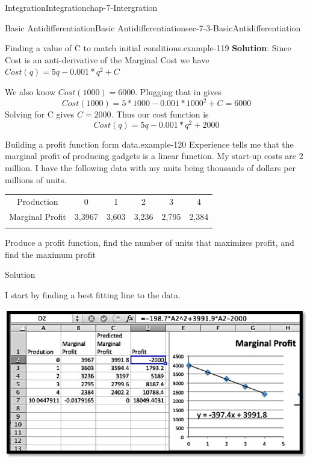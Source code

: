 \documentclass[oneside,10pt,]{book}
\newcommand{\terminology}[1]{\textbf{#1}}
\numberwithin{equation}{section}
\newcommand{\hrulethin}  {\noalign{\hrule height 0.04em}}
\newcommand{\hrulemedium}{\noalign{\hrule height 0.07em}}
\newcommand{\hrulethick} {\noalign{\hrule height 0.11em}}
\begin{document}
\begin{chapterptx}{Integration}{}{Integration}{}{}{chap-7-Intergration}
\begin{sectionptx}{Basic Antidifferentiation}{}{Basic Antidifferentiation}{}{}{sec-7-3-BasicAntidifferentiation}
\begin{example}{Finding a value of C to match initial conditions.}{example-119}
\hypertarget{p-2775}{}%
\terminology{Solution}: Since Cost is an anti-derivative of the Marginal Cost we have \(Cost(q) = 5q - 0.001*q^2  + C\)%
\par
\hypertarget{p-2776}{}%
We also know \(Cost(1000) = 6000\).  Plugging that in gives%
%
\begin{equation*}
Cost(1000)= 5*1000 - 0.001*1000^2  + C=6000
\end{equation*}
\hypertarget{p-2777}{}%
Solving for C gives \(C = 2000\).  Thus our cost function is%
%
\begin{equation*}
Cost(q) = 5q - 0.001*q^2  + 2000
\end{equation*}
\end{example}
\begin{example}{Building a profit function form data.}{example-120}%
\hypertarget{p-2778}{}%
Experience tells me that the marginal profit of producing gadgets is a linear function.  My start-up costs are \textdollar{}2 million.  I have the following data with my units being thousands of dollars per millions of units.%
\begin{sidebyside}{1}{0}{0}{0}%
\begin{sbspanel}{1}%
{\centering%
\begin{tabular}{cccccc}\hrulethick
Production&0&1&2&3&4\tabularnewline\hrulethin
Marginal Profit&\textdollar{}3,3967&\textdollar{}3,603&\textdollar{}3,236&\textdollar{}2,795&\textdollar{}2,384\tabularnewline\hrulemedium
\end{tabular}
\par}
\end{sbspanel}%
\end{sidebyside}%
\par
\hypertarget{p-2779}{}%
Produce a profit function, find the number of units that maximizes profit, and find the maximum profit%
\par
\hypertarget{p-2780}{}%
Solution%
\par
\hypertarget{p-2781}{}%
I start by finding a best fitting line to the data.%
\begin{sidebyside}{1}{0.1}{0.1}{0}%
\begin{sbspanel}{0.8}%
\includegraphics[width=1\linewidth]{images/sec7-3-2.png}

\end{sbspanel}
\end{sidebyside}
\end{example}
\end{sectionptx}
\end{chapterptx}
\end{document}
